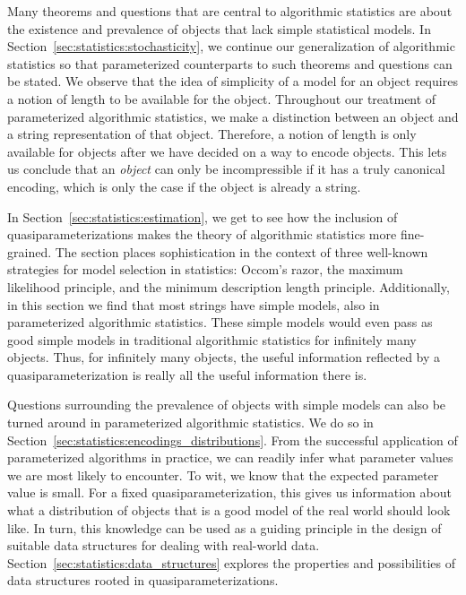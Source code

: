 Many theorems and questions that are central to algorithmic statistics are about the existence and prevalence of objects that lack simple statistical models.
In Section~\ref{sec:statistics:stochasticity}, we continue our generalization of algorithmic statistics so that parameterized counterparts to such theorems and questions can be stated.
We observe that the idea of simplicity of a model for an object requires a notion of length to be available for the object.
Throughout our treatment of parameterized algorithmic statistics, we make a distinction between an object and a string representation of that object.
Therefore, a notion of length is only available for objects after we have decided on a way to encode objects.
This lets us conclude that an \emph{object} can only be incompressible if it has a truly canonical encoding, which is only the case if the object is already a string.

In Section~\ref{sec:statistics:estimation}, we get to see how the inclusion of quasiparameterizations makes the theory of algorithmic statistics more fine-grained.
The section places sophistication in the context of three well-known strategies for model selection in statistics: Occom's razor, the maximum likelihood principle, and the minimum description length principle.
Additionally, in this section we find that most strings have simple models, also in parameterized algorithmic statistics.
These simple models would even pass as good simple models in traditional algorithmic statistics for infinitely many objects.
Thus, for infinitely many objects, the useful information reflected by a quasiparameterization is really all the useful information there is.

Questions surrounding the prevalence of objects with simple models can also be turned around in parameterized algorithmic statistics.
We do so in Section~\ref{sec:statistics:encodings_distributions}.
From the successful application of parameterized algorithms in practice, we can readily infer what parameter values we are most likely to encounter.
To wit, we know that the expected parameter value is small.
For a fixed quasiparameterization, this gives us information about what a distribution of objects that is a good model of the real world should look like.
In turn, this knowledge can be used as a guiding principle in the design of suitable data structures for dealing with real-world data.
Section~\ref{sec:statistics:data_structures} explores the properties and possibilities of data structures rooted in quasiparameterizations.

